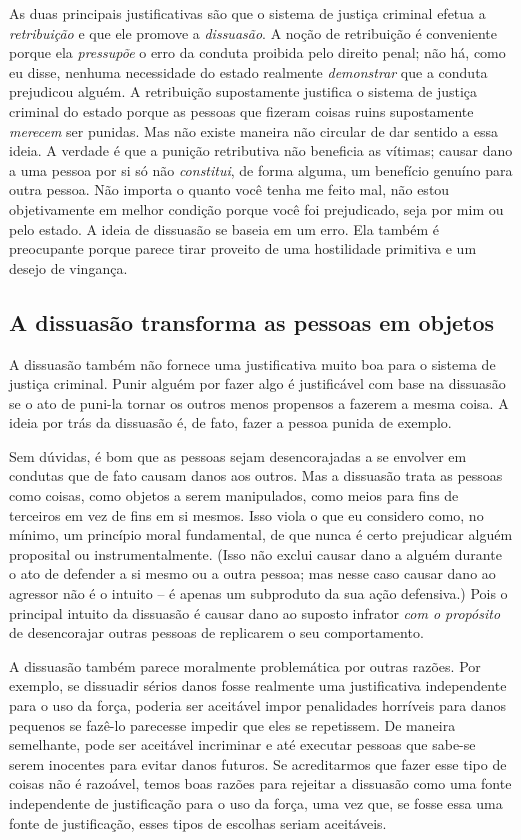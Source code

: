 As duas principais justificativas são que o sistema de justiça criminal efetua a \emph{retribuição} e que ele promove a \emph{dissuasão}. A noção de retribuição é conveniente porque ela \emph{pressupõe} o erro  da conduta proibida pelo direito penal; não há, como eu disse, nenhuma necessidade do estado realmente \emph{demonstrar} que a conduta prejudicou alguém. A retribuição supostamente justifica o sistema de justiça criminal do estado porque as pessoas que fizeram coisas ruins supostamente \emph{merecem} ser punidas. Mas não existe maneira não circular de dar sentido a essa ideia. A verdade é que a punição retributiva não beneficia as vítimas; causar dano a uma pessoa por si só não \emph{constitui}, de forma alguma, um benefício genuíno para outra pessoa. Não importa o quanto você tenha me feito mal, não estou objetivamente em melhor condição porque você foi prejudicado, seja por mim ou pelo estado. A ideia de dissuasão se baseia em um erro. Ela também é preocupante porque parece tirar proveito de uma hostilidade primitiva e um desejo de vingança.

\subsection*{A dissuasão transforma as pessoas em objetos}

A dissuasão também não fornece uma justificativa muito boa para o sistema de justiça criminal. Punir alguém por fazer algo é justificável com base na dissuasão se o ato de puni-la tornar os outros menos propensos a fazerem a mesma coisa. A ideia por trás da dissuasão é, de fato, fazer a pessoa punida de exemplo.

Sem dúvidas, é bom que as pessoas sejam desencorajadas a se envolver em condutas que de fato causam danos aos outros. Mas a dissuasão trata as pessoas como coisas, como objetos a serem manipulados, como meios para fins de terceiros em vez de fins em si mesmos. Isso viola o que eu considero como, no mínimo, um princípio moral fundamental, de que nunca é certo prejudicar alguém proposital ou instrumentalmente. (Isso não exclui causar dano a alguém durante o ato de defender a si mesmo ou a outra pessoa; mas nesse caso causar dano ao agressor não é o intuito -- é apenas um subproduto da sua ação defensiva.) Pois o principal intuito da dissuasão é causar dano ao suposto infrator \emph{com o propósito} de desencorajar outras pessoas de replicarem o seu comportamento.

A dissuasão também parece moralmente problemática por outras razões. Por exemplo, se dissuadir sérios danos fosse realmente uma justificativa independente para o uso da força, poderia ser aceitável impor penalidades horríveis para danos pequenos se fazê-lo parecesse impedir que eles se repetissem. De maneira semelhante, pode ser aceitável incriminar e até executar pessoas que sabe-se serem inocentes para evitar danos futuros. Se acreditarmos que fazer esse tipo de coisas não é razoável, temos boas razões para rejeitar a dissuasão como uma fonte independente de justificação para o uso da força, uma vez que, se fosse essa uma fonte de justificação, esses tipos de escolhas seriam aceitáveis.

